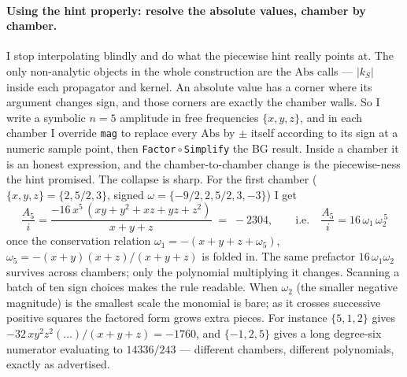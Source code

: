 \documentclass{article}
\begin{document}
\paragraph{Using the hint properly: resolve the absolute values, chamber by
chamber.} I stop interpolating blindly and do what the piecewise hint really
points at. The only non-analytic objects in the whole construction are the
$\mathrm{Abs}$ calls --- $|k_S|$ inside each propagator and kernel. An absolute
value has a corner where its argument changes sign, and those corners are exactly
the chamber walls. So I write a symbolic $n=5$ amplitude in free frequencies
$\{x,y,z\}$, and in each chamber I override \texttt{mag} to replace every
$\mathrm{Abs}$ by $\pm$ itself according to its sign at a numeric sample point,
then \texttt{Factor}\,$\circ$\,\texttt{Simplify} the BG result. Inside a chamber
it is an honest expression, and the chamber-to-chamber change is the
piecewise-ness the hint promised. The collapse is sharp. For the first chamber
($\{x,y,z\}=\{2,5/2,3\}$, signed $\omega=\{-9/2,2,5/2,3,-3\}$) I get
\[
\frac{A_5}{i}=\frac{-16\,x^5\,(xy+y^2+xz+yz+z^2)}{x+y+z}\;=\;-2304,
\qquad\text{i.e.}\quad \frac{A_5}{i}=16\,\omega_1\,\omega_2^{\,5}
\]
once the conservation relation $\omega_1=-(x{+}y{+}z{+}\omega_5)$,
$\omega_5=-(x{+}y)(x{+}z)/(x{+}y{+}z)$ is folded in. The same prefactor
$16\,\omega_1\omega_2$ survives across chambers; only the polynomial multiplying
it changes. Scanning a batch of ten sign choices makes the rule readable. When
$\omega_2$ (the smaller negative magnitude) is the smallest scale the monomial is
bare; as it crosses successive positive squares the factored form grows extra
pieces. For instance $\{5,1,2\}$ gives $-32\,xy^2z^2(\dots)/(x{+}y{+}z)=-1760$,
and $\{-1,2,5\}$ gives a long degree-six numerator evaluating to $14336/243$ ---
different chambers, different polynomials, exactly as advertised.
\end{document}
